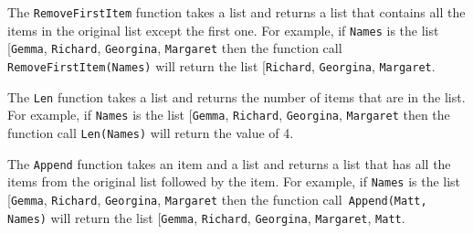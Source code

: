 The \texttt{RemoveFirstItem} function takes a list and returns a list
that contains all the items in the original list except the first
one. For example, if \texttt{Names} is the list {[}\textquotedbl\texttt{Gemma}\textquotedbl ,
\textquotedbl\texttt{Richard}\textquotedbl , \textquotedbl\texttt{Georgina}\textquotedbl ,
\textquotedbl\texttt{Margaret}\textquotedbl{]} then the function
call \texttt{RemoveFirstItem(Names)} will return the list {[}\textquotedbl\texttt{Richard}\textquotedbl ,
\textquotedbl\texttt{Georgina}\textquotedbl , \textquotedbl\texttt{Margaret}\textquotedbl{]}. 

The \texttt{Len} function takes a list and returns the number of items
that are in the list. For example, if \texttt{Names} is the list {[}\textquotedbl\texttt{Gemma}\textquotedbl ,
\textquotedbl\texttt{Richard}\textquotedbl , \textquotedbl\texttt{Georgina}\textquotedbl ,
\textquotedbl\texttt{Margaret}\textquotedbl{]} then the function
call \texttt{Len(Names)} will return the value of 4. 

The \texttt{Append} function takes an item and a list and returns
a list that has all the items from the original list followed by the
item. For example, if \texttt{Names} is the list {[}\textquotedbl\texttt{Gemma}\textquotedbl ,
\textquotedbl\texttt{Richard}\textquotedbl , \textquotedbl\texttt{Georgina}\textquotedbl ,
\textquotedbl\texttt{Margaret}\textquotedbl{]} then the function
call\texttt{ Append(\textquotedbl Matt\textquotedbl , Names)} will
return the list {[}\textquotedbl\texttt{Gemma}\textquotedbl , \textquotedbl\texttt{Richard}\textquotedbl ,
\textquotedbl\texttt{Georgina}\textquotedbl , \textquotedbl\texttt{Margaret}\textquotedbl ,
\textquotedbl\texttt{Matt}\textquotedbl{]}.

